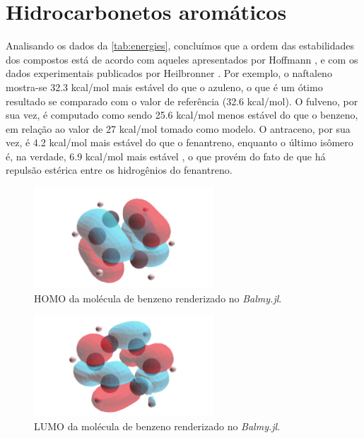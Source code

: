 \section{Hidrocarbonetos aromáticos}

Analisando os dados da \autoref{tab:energies}, concluímos que a ordem das estabilidades dos compostos está de acordo com aqueles apresentados por Hoffmann \autocite{Hoffmann1963}, e com os dados experimentais publicados por Heilbronner \autocite{ginsburg1959}. Por exemplo, o naftaleno mostra-se 32.3 kcal/mol mais estável do que o azuleno, o que é um ótimo resultado se comparado com o valor de referência (32.6 kcal/mol)\autocite{ginsburg1959}. O fulveno, por sua vez, é computado como sendo 25.6 kcal/mol menos estável do que o benzeno, em relação ao valor de 27 kcal/mol tomado como modelo\autocite{CHENG1956}. O antraceno, por sua vez, é 4.2 kcal/mol mais estável do que o fenantreno, enquanto o último isômero é, na verdade, 6.9 kcal/mol mais estável \autocite{Hoffmann1963}, o que provém do fato de que há repulsão estérica entre os hidrogênios do fenantreno.


\begin{figure}[htb]
\caption{\label{fig:HOMobenz} \gls{HOMO} da molécula de benzeno renderizado no \textit{Balmy.jl}.}
	\begin{center}
		\includegraphics[width=0.6\textwidth]{images/30.png}
	\end{center}
\end{figure}

\begin{figure}[htb]
\caption{\label{fig:HOMobenz} \gls{LUMO} da molécula de benzeno renderizado no \textit{Balmy.jl}.}
	\begin{center}
		\includegraphics[width=0.6\textwidth]{images/31.png}
	\end{center}
\end{figure}

